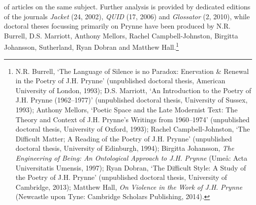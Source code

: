 \documentclass[]{article}
\begin{document}
of articles on the same subject. Further analysis is provided by
dedicated editions of the journals \emph{Jacket} (24, 2002), \emph{QUID}
(17, 2006) and \emph{Glossator} (2, 2010), while doctoral theses
focussing primarily on Prynne have been produced by N.R. Burrell, D.S.
Marriott, Anthony Mellors, Rachel Campbell-Johnston, Birgitta Johansson,
Sutherland, Ryan Dobran and Matthew Hall.\footnote{N.R. Burrell, `The
  Language of Silence is no Paradox: Enervation \& Renewal in the Poetry
  of J.H. Prynne' (unpublished doctoral thesis, American University of
  London, 1993); D.S. Marriott, `An Introduction to the Poetry of J.H.
  Prynne (1962--1977)' (unpublished doctoral thesis, University of
  Sussex, 1993); Anthony Mellors, `Poetic Space and the Late Modernist
  Text: The Theory and Context of J.H. Prynne's Writings from
  1960--1974' (unpublished doctoral thesis, University of Oxford, 1993);
  Rachel Campbell-Johnston, `The Difficult Matter; A Reading of the
  Poetry of J.H. Prynne' (unpublished doctoral thesis, University of
  Edinburgh, 1994); Birgitta Johansson, \emph{The Engineering of Being:
  An Ontological Approach to J.H. Prynne} (Umeå: Acta Universitatis
  Umensis, 1997); Ryan Dobran, `The Difficult Style: A Study of the
  Poetry of J.H. Prynne' (unpublished doctoral thesis, University of
  Cambridge, 2013); Matthew Hall, \emph{On Violence in the Work of J.H.
  Prynne} (Newcastle upon Tyne: Cambridge Scholars Publishing, 2014).}
\end{document}
